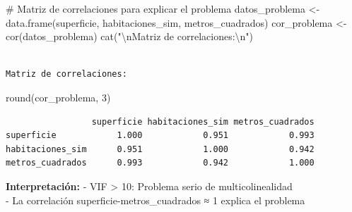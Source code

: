\documentclass[
  letterpaper,
  DIV=11,
  numbers=noendperiod]{scrreprt}
\newenvironment{Shaded}{\begin{snugshade}}{\end{snugshade}}
\newcommand{\CommentTok}[1]{\textcolor[rgb]{0.37,0.37,0.37}{#1}}
\newcommand{\DecValTok}[1]{\textcolor[rgb]{0.68,0.00,0.00}{#1}}
\newcommand{\FunctionTok}[1]{\textcolor[rgb]{0.28,0.35,0.67}{#1}}
\newcommand{\NormalTok}[1]{\textcolor[rgb]{0.00,0.23,0.31}{#1}}
\newcommand{\OtherTok}[1]{\textcolor[rgb]{0.00,0.23,0.31}{#1}}
\newcommand{\SpecialCharTok}[1]{\textcolor[rgb]{0.37,0.37,0.37}{#1}}
\newcommand{\StringTok}[1]{\textcolor[rgb]{0.13,0.47,0.30}{#1}}
\begin{document}
\begin{tcolorbox}
\begin{Shaded}
\begin{Highlighting}[]
\CommentTok{\# Matriz de correlaciones para explicar el problema}
\NormalTok{datos\_problema }\OtherTok{\textless{}{-}} \FunctionTok{data.frame}\NormalTok{(superficie, habitaciones\_sim, metros\_cuadrados)}
\NormalTok{cor\_problema }\OtherTok{\textless{}{-}} \FunctionTok{cor}\NormalTok{(datos\_problema)}
\FunctionTok{cat}\NormalTok{(}\StringTok{"}\SpecialCharTok{\textbackslash{}n}\StringTok{Matriz de correlaciones:}\SpecialCharTok{\textbackslash{}n}\StringTok{"}\NormalTok{)}
\end{Highlighting}
\end{Shaded}

\begin{verbatim}

Matriz de correlaciones:
\end{verbatim}

\begin{Shaded}
\begin{Highlighting}[]
\FunctionTok{round}\NormalTok{(cor\_problema, }\DecValTok{3}\NormalTok{)}
\end{Highlighting}
\end{Shaded}

\begin{verbatim}
                 superficie habitaciones_sim metros_cuadrados
superficie            1.000            0.951            0.993
habitaciones_sim      0.951            1.000            0.942
metros_cuadrados      0.993            0.942            1.000
\end{verbatim}

\textbf{Interpretación:} - VIF \textgreater{} 10: Problema serio de
multicolinealidad\\
- La correlación superficie-metros\_cuadrados ≈ 1 explica el problema

\end{tcolorbox}
\end{document}

